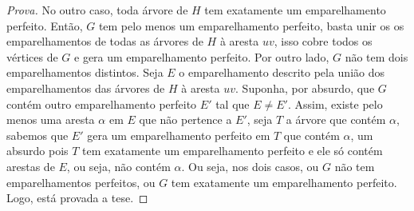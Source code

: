 \documentclass[12pt]{article}
\begin{document}
\begin{proof}[Prova]
No outro caso, toda árvore de $H$ tem exatamente um emparelhamento perfeito. Então, $G$ tem pelo menos um emparelhamento perfeito, basta unir os os emparelhamentos de todas as árvores de $H$ à aresta $uv$, isso cobre todos os vértices de $G$ e gera um emparelhamento perfeito. Por outro lado, $G$ não tem dois emparelhamentos distintos. Seja $E$ o emparelhamento descrito pela união dos emparelhamentos das árvores de $H$ à aresta $uv$. Suponha, por absurdo, que $G$ contém outro emparelhamento perfeito $E'$ tal que $E \neq E'$. Assim, existe pelo menos uma aresta $\alpha$ em $E$ que não pertence a $E'$, seja $T$ a árvore que contém $\alpha$, sabemos que $E'$ gera um emparelhamento perfeito em $T$ que contém $\alpha$, um absurdo pois $T$ tem exatamente um emparelhamento perfeito e ele só contém arestas de $E$, ou seja, não contém $\alpha$.
Ou seja, nos dois casos, ou $G$ não tem emparelhamentos perfeitos, ou $G$ tem exatamente um emparelhamento perfeito. Logo, está provada a tese.
\end{proof}
\end{document}
